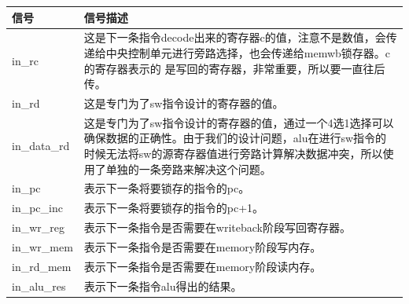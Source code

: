 \begin{center}
    \label{table:alumem}
    \begin{longtable}{p{}p{}}
        \toprule
        信号 & 信号描述 \\
        \midrule
        in\_rc &  这是下一条指令decode出来的寄存器c的值，注意不是数值，会传递给中央控制单元进行旁路选择，也会传递给memwb锁存器。c的寄存器表示的
        是写回的寄存器，非常重要，所以要一直往后传。\\
        in\_rd & 这是专门为了sw指令设计的寄存器的值。\\ 
        in\_data\_rd & 这是专门为了sw指令设计的寄存器的值，通过一个4️选1选择可以确保数据的正确性。由于我们的设计问题，alu在进行sw指令的时候无法将sw的源寄存器值进行旁路计算解决数据冲突，所以使用了单独的一条旁路来解决这个问题。\\
        in\_pc &  表示下一条将要锁存的指令的pc。\\
        in\_pc\_inc &  表示下一条将要锁存的指令的pc+1。\\
        in\_wr\_reg &  表示下一条指令是否需要在writeback阶段写回寄存器。\\
        in\_wr\_mem &  表示下一条指令是否需要在memory阶段写内存。\\
        in\_rd\_mem &  表示下一条指令是否需要在memory阶段读内存。\\
        in\_alu\_res & 表示下一条指令alu得出的结果。\\
        

\end{longtable}
\end{center}
